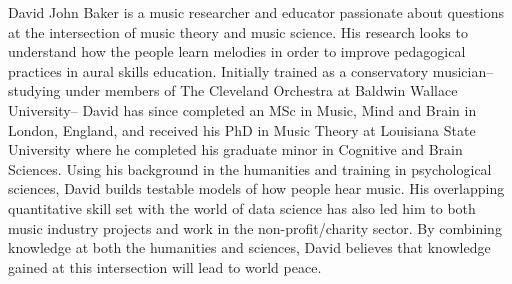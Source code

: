 \documentclass[12pt,]{book}
\begin{document}
David John Baker is a music researcher and educator passionate about questions at the intersection of music theory and music science.
His research looks to understand how the people learn melodies in order to improve pedagogical practices in aural skills education.
Initially trained as a conservatory musician-- studying under members of The Cleveland Orchestra at Baldwin Wallace University-- David has since completed an MSc in Music, Mind and Brain in London, England, and received his PhD in Music Theory at Louisiana State University where he completed his graduate minor in Cognitive and Brain Sciences.
Using his background in the humanities and training in psychological sciences, David builds testable models of how people hear music.
His overlapping quantitative skill set with the world of data science has also led him to both music industry projects and work in the non-profit/charity sector.
By combining knowledge at both the humanities and sciences, David believes that knowledge gained at this intersection will lead to world peace.
\end{document}
